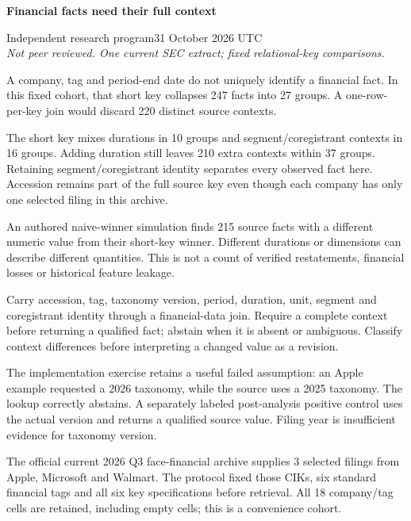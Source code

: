 \documentclass[11pt,letterpaper]{article}
\newcommand{\heading}[1]{\vspace{4pt}{\large\bfseries #1}\par}
\newcommand{\BoundA}{247}
\newcommand{\BoundB}{27}
\newcommand{\BoundC}{220}
\newcommand{\BoundD}{10}
\newcommand{\BoundE}{16}
\newcommand{\BoundF}{210}
\newcommand{\BoundG}{37}
\newcommand{\BoundH}{215}
\newcommand{\BoundI}{3}
\newcommand{\BoundJ}{18}
\begin{document}
{\LARGE\bfseries Financial facts need their full context\par}
\vspace{5pt}
Independent research program\hfill 31 October 2026 UTC\\
\textit{Not peer reviewed. One current SEC extract; fixed relational-key comparisons.}

\heading{Practical finding}
A company, tag and period-end date do not uniquely identify a financial fact. In this fixed cohort, that short key collapses \BoundA{} facts into \BoundB{} groups. A one-row-per-key join would discard \BoundC{} distinct source contexts.

The short key mixes durations in \BoundD{} groups and segment/coregistrant contexts in \BoundE{} groups. Adding duration still leaves \BoundF{} extra contexts within \BoundG{} groups. Retaining segment/coregistrant identity separates every observed fact here. Accession remains part of the full source key even though each company has only one selected filing in this archive.

An authored naive-winner simulation finds \BoundH{} source facts with a different numeric value from their short-key winner. Different durations or dimensions can describe different quantities. This is not a count of verified restatements, financial losses or historical feature leakage.

\heading{Recommended use}
Carry accession, tag, taxonomy version, period, duration, unit, segment and coregistrant identity through a financial-data join. Require a complete context before returning a qualified fact; abstain when it is absent or ambiguous. Classify context differences before interpreting a changed value as a revision.

The implementation exercise retains a useful failed assumption: an Apple example requested a 2026 taxonomy, while the source uses a 2025 taxonomy. The lookup correctly abstains. A separately labeled post-analysis positive control uses the actual version and returns a qualified source value. Filing year is insufficient evidence for taxonomy version.

\heading{Fixed source and scope}
The official current 2026 Q3 face-financial archive supplies \BoundI{} selected filings from Apple, Microsoft and Walmart. The protocol fixed those CIKs, six standard financial tags and all six key specifications before retrieval. All \BoundJ{} company/tag cells are retained, including empty cells; this is a convenience cohort.
\end{document}
